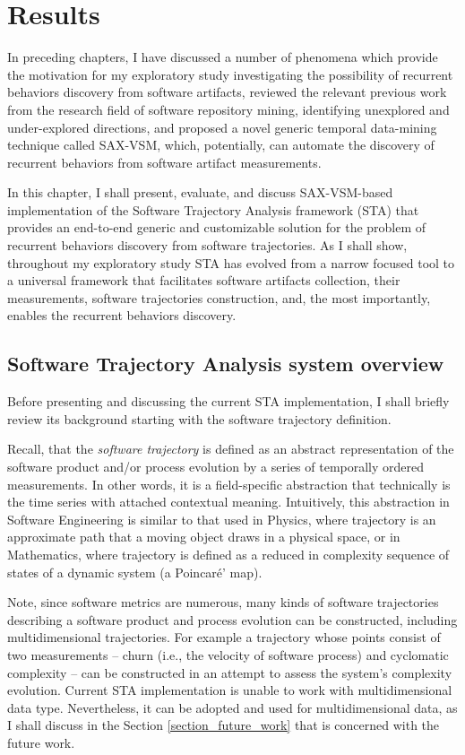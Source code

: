 \chapter{Results}\label{chapter_sta}
In preceding chapters, I have discussed a number of phenomena which provide the motivation for my exploratory study investigating the possibility of recurrent behaviors discovery from software artifacts, reviewed the relevant previous work from the research field of software repository mining, identifying unexplored and under-explored directions, and proposed a novel generic temporal data-mining technique called \mbox{SAX-VSM}, which, potentially, can automate the discovery of recurrent behaviors from software artifact measurements.

In this chapter, I shall present, evaluate, and discuss \mbox{SAX-VSM}-based implementation of the Software Trajectory Analysis framework (STA) that provides an end-to-end generic and customizable solution for the problem of recurrent behaviors discovery from software trajectories.  As I shall show, throughout my exploratory study STA has evolved from a narrow focused tool to a universal framework that facilitates software artifacts collection, their measurements, software trajectories construction, and, the most importantly, enables the recurrent behaviors discovery.

\section{Software Trajectory Analysis system overview}\label{section_sta_overview}
Before presenting and discussing the current STA implementation, I shall briefly review its background starting with the software trajectory definition. 

Recall, that the \textit{software trajectory} is defined as an abstract representation of the software product and/or process evolution by a series of temporally ordered measurements. In other words, it is a field-specific abstraction that technically is the time series with attached contextual meaning. Intuitively, this abstraction in Software Engineering is similar to that used in Physics, where trajectory is an approximate path that a moving object draws in a physical space, or in Mathematics, where trajectory is defined as a reduced in complexity sequence of states of a dynamic system (a Poincar\'{e}' map).

Note, since software metrics are numerous, many kinds of software trajectories describing a software product and process evolution can be constructed, including multidimensional trajectories. For example a trajectory whose points consist of two measurements -- churn (i.e., the velocity of software process) and cyclomatic complexity -- can be constructed in an attempt to assess the system's complexity evolution. Current STA implementation is unable to work with multidimensional data type. Nevertheless, it can be adopted and used for multidimensional data, as I shall discuss in the Section \ref{section_future_work} that is concerned with the future work.

